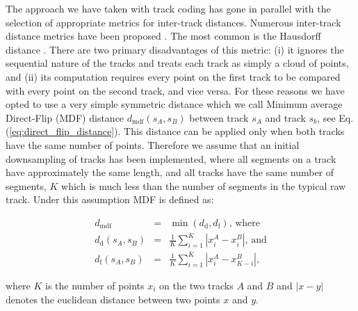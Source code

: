 \documentclass[preprint,authoryear,a4paper,10pt,onecolumn]{elsarticle}
\begin{document}
The approach we have taken with track coding has gone in parallel with
the selection of appropriate metrics for inter-track distances.
Numerous inter-track distance metrics have been proposed
\citep{Ding2003, MaddahIPMI2007, zhang2005dti}. The most common is the
Hausdorff distance \citep[and many other
studies]{corouge2004towards}. There are two primary disadvantages of
this metric: (i) it ignores the sequential nature of the tracks and
treats each track as simply a cloud of points, and (ii) its computation
requires every point on the first track to be compared with every point
on the second track, and vice versa. For these reasons we have opted to
use a very simple symmetric distance \citep{EGMB10, Visser2010} which we
call Minimum average Direct-Flip (MDF) distance
$d_{\textrm{mdf}}(s_{A},s_{B})$ between track $s_{A}$ and track $s_{b}$,
see Eq. (\ref{eq:direct_flip_distance}).  This distance can be applied
only when both tracks have the same number of points. Therefore we
assume that an initial downsampling of tracks has been implemented,
where all segments on a track have approximately the same length, and
all tracks have the same number of segments, $K$ which is much less than
the number of segments in the typical raw track. Under this assumption MDF is
defined as:

\begin{eqnarray}
d_{\textrm{mdf}} & = & \min(d_{\textrm{d}},d_{\textrm{f}}),\,\textrm{where}\nonumber\\
d_{\textrm{d}}(s_{A},s_{B}) & = & \frac{1}{K}\sum_{i=1}^{K}|x_{i}^{A}-x_{i}^{B}|,\,\textrm{and}\label{eq:direct_flip_distance} \\
d_{\textrm{f}}(s_{A},s_{B}) & = & \frac{1}{K}\sum_{i=1}^{K}|x_{i}^{A}-x_{K-i}^{B}|,\nonumber
\end{eqnarray}

\noindent
where $K$ is the number of points $x_{i}$ on the two tracks $A$ and $B$
and $|x-y|$ denotes the euclidean distance between two points $x$ and
$y$.
\end{document}
